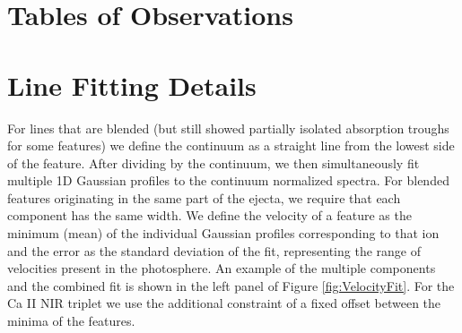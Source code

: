\documentclass[a4paper,fleqn,usenatbib]{mnras}
\begin{document}



\appendix
\section{Tables of Observations}


\section{Line Fitting Details}\label{AppLineFit}
For lines that are blended (but still showed partially isolated absorption troughs for some features) we define the continuum as a straight line from the lowest side of the feature. 
After dividing by the continuum, we then simultaneously fit multiple 1D Gaussian profiles to the continuum normalized spectra. 
For blended features originating in the same part of the ejecta, we require that each component has the same width.
We define the velocity of a feature as the minimum (mean) of the individual Gaussian profiles corresponding to that ion and the error as the standard deviation of the fit, representing the range of velocities present in the photosphere. 
An example of the multiple components and the combined fit is shown in the left panel of Figure \ref{fig:VelocityFit}.
For the Ca II NIR triplet we use the additional constraint of a fixed offset between the minima of the features. 
\end{document}

